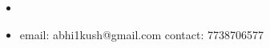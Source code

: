 \begin{itemize}
\item[]\hspace{-0.32cm}{\bf Abhishek Pratap Singh}\\[-0.6cm]
\item[]\hspace{-0.32cm}email: abhi1kush@gmail.com \hspace{9.5cm}contact: 7738706577\\[-0.6cm]	
\end{itemize}



